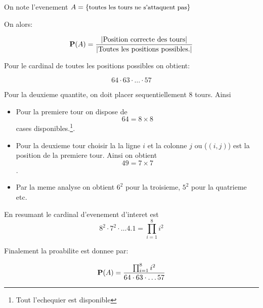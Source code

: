 \documentclass[a4paper]{tufte-handout}
\begin{document}
On note l'evenement $A = \{\text{\small toutes les tours ne s'attaquent pas}\}$

On alors:

$$
\P (A) = \frac{\vert \text{Position correcte des tours}\vert}{\vert\text{Toutes
les positions possibles.} \vert}
$$

Pour le cardinal de toutes les positions possibles on obtient:

$$
64\cdot 63 \cdot \ldots\cdot 57
$$

Pour la deuxieme quantite, on doit placer sequentiellement $8$ tours. Ainsi
\begin{itemize}
  \item Pour la premiere tour on dispose de $$64= 8 \times 8$$ cases
    disponibles.\footnote{Tout l'echequier est disponible}.
  \item Pour la deuxieme tour choisir la la ligne $i$ et la colonne $j$ ou
    ($(i,j)$) est la position de la premiere tour. Ainsi on obtient $$49 = 7
    \times 7$$.
  \item Par la meme analyse on obtient 
    $6^2$ pour la troisieme, $5^2$ pour la quatrieme etc.
\end{itemize}

En resumant le cardinal d'evenement d'interet est 
$$
8^2 \cdot 7^2 \cdot \ldots  4 . 1 = \prod_{i=1}^8 i^2
$$

Finalement la proabilite est donnee par:

$$
\P(A) = \dfrac{\prod_{i=1}^8 i^2}{64\cdot 63\cdot \ldots 57}
$$
\end{document}

